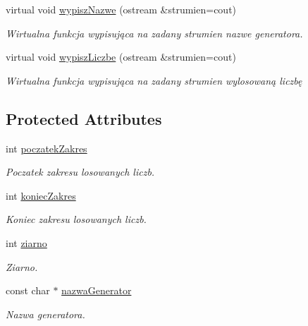 \begin{DoxyCompactItemize}
virtual void \hyperlink{classaghGenerator_a0b082ee64f661bddeabd332a4cd77d4d}{wypisz\-Nazwe} (ostream \&strumien=cout)
\begin{DoxyCompactList}\small\item\em \-Wirtualna funkcja wypisująca na zadany strumien nazwe generatora. \end{DoxyCompactList}\item 
virtual void \hyperlink{classaghGenerator_aa8924c92e6ba31c7e86d0497acf2c7e6}{wypisz\-Liczbe} (ostream \&strumien=cout)
\begin{DoxyCompactList}\small\item\em \-Wirtualna funkcja wypisująca na zadany strumien wylosowaną liczbę \end{DoxyCompactList}\end{DoxyCompactItemize}
\subsection*{\-Protected \-Attributes}
\begin{DoxyCompactItemize}
\item 
\hypertarget{classaghGenerator_acc20585e122620d3516e8562d728f395}{int \hyperlink{classaghGenerator_acc20585e122620d3516e8562d728f395}{poczatek\-Zakres}}\label{classaghGenerator_acc20585e122620d3516e8562d728f395}

\begin{DoxyCompactList}\small\item\em \-Poczatek zakresu losowanych liczb. \end{DoxyCompactList}\item 
\hypertarget{classaghGenerator_a84c85c5027026faba75b363ab47f6d3b}{int \hyperlink{classaghGenerator_a84c85c5027026faba75b363ab47f6d3b}{koniec\-Zakres}}\label{classaghGenerator_a84c85c5027026faba75b363ab47f6d3b}

\begin{DoxyCompactList}\small\item\em \-Koniec zakresu losowanych liczb. \end{DoxyCompactList}\item 
\hypertarget{classaghGenerator_a93ca29cc005efab9a843559efa83beba}{int \hyperlink{classaghGenerator_a93ca29cc005efab9a843559efa83beba}{ziarno}}\label{classaghGenerator_a93ca29cc005efab9a843559efa83beba}

\begin{DoxyCompactList}\small\item\em \-Ziarno. \end{DoxyCompactList}\item 
\hypertarget{classaghGenerator_aeb505aaedb6b55973608f6a0f7f7c6a5}{const char $\ast$ \hyperlink{classaghGenerator_aeb505aaedb6b55973608f6a0f7f7c6a5}{nazwa\-Generator}}\label{classaghGenerator_aeb505aaedb6b55973608f6a0f7f7c6a5}

\begin{DoxyCompactList}\small\item\em \-Nazwa generatora. \end{DoxyCompactList}\end{DoxyCompactItemize}


